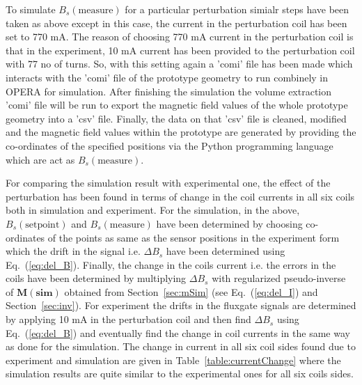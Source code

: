 To simulate $B_s(\text{measure})$ for a particular perturbation simialr steps have been taken as above except in this case, the current in the perturbation coil has been set to 770 mA. The reason of choosing 770 mA current in the perturbation coil is that in the experiment, 10 mA current has been provided to the perturbation coil with 77 no of turns. So, with this setting again a 'comi' file has been made which interacts with the 'comi' file of the prototype geometry to run combinely in OPERA for simulation. After finishing the simulation the volume extraction 'comi' file will be run to export the magnetic field values of the whole prototype geometry into a 'csv' file. Finally, the data on that 'csv' file is cleaned, modified and the magnetic field values within the prototype are generated by providing the co-ordinates of the specified positions via the Python programming language which are act as $B_s(\text{measure})$.



For comparing the simulation result with experimental one, the effect of the perturbation has been found in terms of change in the coil currents in all six coils both in simulation and experiment. For the simulation, in the above, $B_s(\text{setpoint})$ and $B_s(\text{measure})$ have been determined by choosing co-ordinates of the points as same as the sensor positions in the experiment form which the drift in the signal i.e. $\Delta B_s$ have been determined using Eq.~(\ref{eq:del_B}). Finally, the change in the coils current i.e. the errors in the coils have been determined by multiplying $\Delta B_s$ with regularized pseudo-inverse of $\bm{M(\text{sim})}$ obtained from Section~\ref{sec:mSim} (see Eq.~(\ref{eq:del_I}) and Section~\ref{sec:inv}). For experiment the drifts in the fluxgate signals are determined by applying 10 mA in the perturbation  coil and then find $\Delta B_s$ using Eq.~(\ref{eq:del_B}) and eventually find the change in coil currents in the same way as done for the simulation. The change in current in all six coil sides found due to experiment and simulation are given in Table~\ref{table:currentChange} where the simulation results are quite similar to the experimental ones for all six coils sides.

